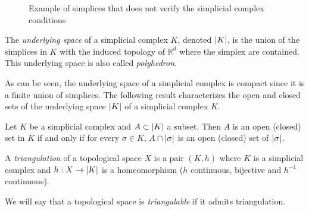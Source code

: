 \documentclass[../main.tex]{subfiles}
\begin{document}
\begin{figure}[ht]
\centering
{}
\caption{Example of simplices that does not verify the simplicial complex conditions}
\label{ref:noComp}
\end{figure}

\begin{definition}
The \emph{underlying space} of a simplicial complex $K$, denoted $\lvert K\rvert$, is the union of the simplices in $K$ with the induced topology of $\mathbb{R}^d$ where the simplex are contained. This underlying space is also called \emph{polyhedron}.
\end{definition}
As can be seen, the underlying space of a simplicial complex is compact since it is a finite union of simplices. The following result characterizes the open and closed sets of the underlying space $\lvert K\rvert$ of a simplicial complex $K$.

\begin{proposition}
Let $K$ be a simplicial complex and $A \subset \lvert K\rvert$ a subset. Then $A$ is an open (closed) set in $K$ if and only if for every $\sigma \in K$, $A \cap \lvert\sigma\rvert$ is an open (closed) set of $\lvert\sigma\rvert$.
\end{proposition}

\begin{definition}
A \emph{triangulation} of a topological space $X$ is a pair $(K, h)$ where $K$ is a simplicial complex and $h: X \to \lvert K\rvert$ is a homeomorphism ($h $ continuous, bijective and $h^{-1}$ continuous).
\end{definition}
We will say that a topological space is \emph{triangulable} if it admits triangulation.\\
\end{document}
